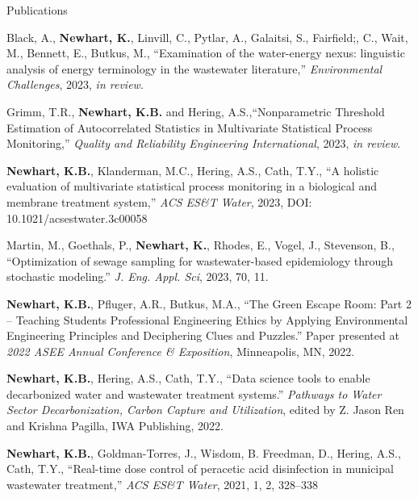 \documentclass{resume} %
\begin{document}
\begin{rSection}{Publications}
\begin{etaremune}

	\item Black, A.,  \textbf{Newhart, K.},  Linvill, C.,  Pytlar, A., Galaitsi, S.,  Fairfield;, C.,  Wait, M.,  Bennett, E.,  Butkus, M., ``Examination of the water-energy nexus: linguistic analysis of energy terminology in the wastewater literature,'' \emph{Environmental Challenges}, 2023, \emph{in review}.

	\item Grimm, T.R., \textbf{Newhart, K.B.} and Hering, A.S.,``Nonparametric Threshold Estimation of Autocorrelated Statistics in Multivariate Statistical Process Monitoring,'' \emph{Quality and Reliability Engineering International}, 2023, \emph{in review}.

	\item \textbf{Newhart, K.B.}, Klanderman, M.C., Hering, A.S., Cath, T.Y., ``A holistic evaluation of multivariate statistical process monitoring in a biological and membrane treatment system,'' \emph{ACS ES\&T Water}, 2023, DOI: 10.1021/acsestwater.3c00058

	\item Martin, M., Goethals, P., \textbf{Newhart, K.}, Rhodes, E., Vogel, J., Stevenson, B., ``Optimization of sewage sampling for wastewater-based epidemiology through stochastic modeling.'' \emph{J. Eng. Appl. Sci}, 2023, 70, 11.

	\item\textbf{Newhart, K.B.}, Pfluger, A.R., Butkus, M.A., ``The Green Escape Room: Part 2 – Teaching Students Professional Engineering Ethics by Applying Environmental Engineering Principles and Deciphering Clues and Puzzles.'' Paper presented at \emph{2022 ASEE Annual Conference \& Exposition}, Minneapolis, MN, 2022.

	\item \textbf{Newhart, K.B.}, Hering, A.S., Cath, T.Y., ``Data science tools to enable decarbonized water and wastewater treatment systems.'' \emph{Pathways to Water Sector Decarbonization, Carbon Capture and Utilization}, edited by Z. Jason Ren and Krishna Pagilla, IWA Publishing, 2022.

	\item \textbf{Newhart, K.B.}, Goldman-Torres, J., Wisdom, B. Freedman, D., Hering, A.S., Cath, T.Y., ``Real-time dose control of peracetic acid disinfection in municipal wastewater treatment,'' \emph{ACS ES\&T Water}, 2021, 1, 2, 328–338


\end{etaremune}
\end{rSection}
\end{document}
